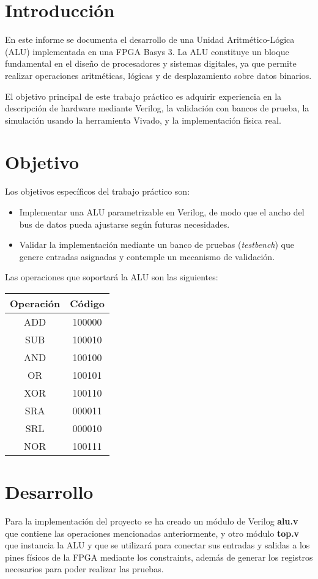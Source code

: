 \section{Introducción}
En este informe se documenta el desarrollo de una Unidad Aritmético-Lógica (ALU) implementada en una FPGA Basys 3.  
La ALU constituye un bloque fundamental en el diseño de procesadores y sistemas digitales, ya que permite realizar operaciones aritméticas, lógicas y de desplazamiento sobre datos binarios.  

El objetivo principal de este trabajo práctico es adquirir experiencia en la descripción de hardware mediante Verilog, la validación con bancos de prueba, la simulación usando la herramienta Vivado, y la implementación física real.

\section{Objetivo}
Los objetivos específicos del trabajo práctico son:  
\begin{itemize}
    \item Implementar una ALU parametrizable en Verilog, de modo que el ancho del bus de datos pueda ajustarse según futuras necesidades.
    \item Validar la implementación mediante un banco de pruebas (\textit{testbench}) que genere entradas asignadas y contemple un mecanismo de validación.
\end{itemize}

Las operaciones que soportará la ALU son las siguientes:  
\begin{center}
\begin{tabular}{|c|c|}
\hline
\textbf{Operación} & \textbf{Código}\\
\hline
ADD & 100000 \\
SUB & 100010 \\
AND & 100100 \\
OR  & 100101 \\
XOR & 100110 \\
SRA & 000011 \\
SRL & 000010 \\
NOR & 100111 \\
\hline
\end{tabular}
\end{center}

\section{Desarrollo}
Para la implementación del proyecto se ha creado un módulo de Verilog \textbf{alu.v} que contiene las operaciones mencionadas anteriormente, y otro módulo \textbf{top.v} que instancia la ALU y que se utilizará para conectar sus entradas y salidas a los pines físicos de la FPGA mediante los constraints, además de generar los registros necesarios para poder realizar las pruebas.

